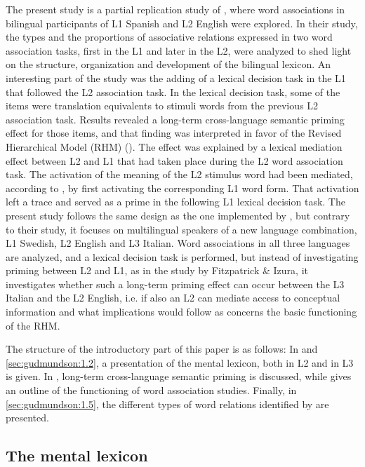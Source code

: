 \documentclass[output=paper,colorlinks,citecolor=brown,nonflat]{langsci/langscibook}
\begin{document}
The present study is a partial replication study of \citet{FitzpatrickIzura2011}, where word associations in bilingual participants of L1 Spanish and L2 English were explored. In their study, the types and the proportions of associative relations expressed in two word association tasks, first in the L1 and later in the L2, were analyzed to shed light on the structure, organization and development of the bilingual lexicon. An interesting part of the \citeauthor{FitzpatrickIzura2011} study was the adding of a lexical decision task in the L1 that followed the L2 association task. In the lexical decision task, some of the items were translation equivalents to stimuli words from the previous L2 association task. Results revealed a long-term cross-language semantic priming effect for those items, and that finding was interpreted in favor of the Revised Hierarchical Model (RHM) (\citealt{KrollStewart1994}). The effect was explained by a lexical mediation effect between L2 and L1 that had taken place during the L2 word association task. The activation of the meaning of the L2 stimulus word had been mediated, according to \citeauthor{FitzpatrickIzura2011}, by first activating the corresponding L1 word form. That activation left a trace and served as a prime in the following L1 lexical decision task. The present study follows the same design as the one implemented by \citet{FitzpatrickIzura2011}, but contrary to their study, it focuses on multilingual speakers of a new language combination, L1 Swedish, L2 English and L3 Italian. Word associations in all three languages are analyzed, and a lexical decision task is performed, but instead of investigating priming between L2 and L1, as in the study by Fitzpatrick \& Izura, it investigates whether such a long-term priming effect can occur between the L3 Italian and the L2 English, i.e. if also an L2 can mediate access to conceptual information and what implications would follow as concerns the basic functioning of the RHM.

The structure of the introductory part of this paper is as follows: In  and \ref{sec:gudmundson:1.2}, a presentation of the mental lexicon, both in L2 and in L3 is given. In , long-term cross-language semantic priming is discussed, while  gives an outline of the functioning of word association studies. Finally, in \ref{sec:gudmundson:1.5}, the different types of word relations identified by \citet{FitzpatrickIzura2011} are presented.

\subsection{The mental lexicon}\label{sec:gudmundson:1.1}
\end{document}
